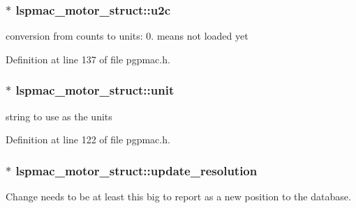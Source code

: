 \hypertarget{structlspmac__motor__struct_a8838915ebb6f9989944117c8197d5e86}{
\subsubsection[{u2c}]{$\ast$ lspmac\-\_\-motor\-\_\-struct\-::u2c}}\label{structlspmac__motor__struct_a8838915ebb6f9989944117c8197d5e86}


conversion from counts to units\-: 0. means not loaded yet 



Definition at line 137 of file pgpmac.\-h.

\hypertarget{structlspmac__motor__struct_af8e6eb1df6b0d343fc4da93fbdd63133}{
\subsubsection[{unit}]{$\ast$ lspmac\-\_\-motor\-\_\-struct\-::unit}}\label{structlspmac__motor__struct_af8e6eb1df6b0d343fc4da93fbdd63133}


string to use as the units 



Definition at line 122 of file pgpmac.\-h.

\hypertarget{structlspmac__motor__struct_aefa84c7592369090eec8b211caaa3a51}{
\subsubsection[{update\-\_\-resolution}]{$\ast$ lspmac\-\_\-motor\-\_\-struct\-::update\-\_\-resolution}}\label{structlspmac__motor__struct_aefa84c7592369090eec8b211caaa3a51}


Change needs to be at least this big to report as a new position to the database. 



